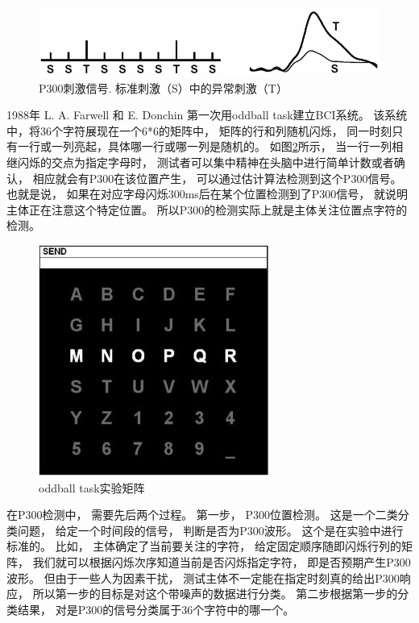 \begin{figure}[htb]
\centering
\includegraphics[scale=0.6]{Pictures/Chap1/p300_example.png}
\caption{P300刺激信号. 标准刺激（S）中的异常刺激（T）}
\label{Fig:P300_brief}
\end{figure}


1988年 L. A. Farwell 和 E. Donchin 第一次用oddball task建立BCI系统\cite{farwell1988talking}。 该系统中，将36个字符展现在一个6*6的矩阵中， 矩阵的行和列随机闪烁， 同一时刻只有一行或一列亮起，具体哪一行或哪一列是随机的。 如图\ref{Fig:p300matrix}所示， 当一行一列相继闪烁的交点为指定字母时， 测试者可以集中精神在头脑中进行简单计数或者确认， 相应就会有P300在该位置产生， 可以通过估计算法检测到这个P300信号。 也就是说， 如果在对应字母闪烁300ms后在某个位置检测到了P300信号， 就说明主体正在注意这个特定位置。 所以P300的检测实际上就是主体关注位置点字符的检测。  

\begin{figure}[htb]
\centering
\includegraphics[scale=0.8]{Pictures/Chap1/p300_matrix.jpg}
\caption{oddball task实验矩阵}
\label{Fig:p300matrix}
\end{figure}

在P300检测中， 需要先后两个过程。 第一步， P300位置检测。 这是一个二类分类问题， 给定一个时间段的信号， 判断是否为P300波形。 这个是在实验中进行标准的。 比如， 主体确定了当前要关注的字符， 给定固定顺序随即闪烁行列的矩阵， 我们就可以根据闪烁次序知道当前是否闪烁指定字符， 即是否预期产生P300波形。 但由于一些人为因素干扰， 测试主体不一定能在指定时刻真的给出P300响应， 所以第一步的目标是对这个带噪声的数据进行分类。 第二步根据第一步的分类结果， 对是P300的信号分类属于36个字符中的哪一个。




